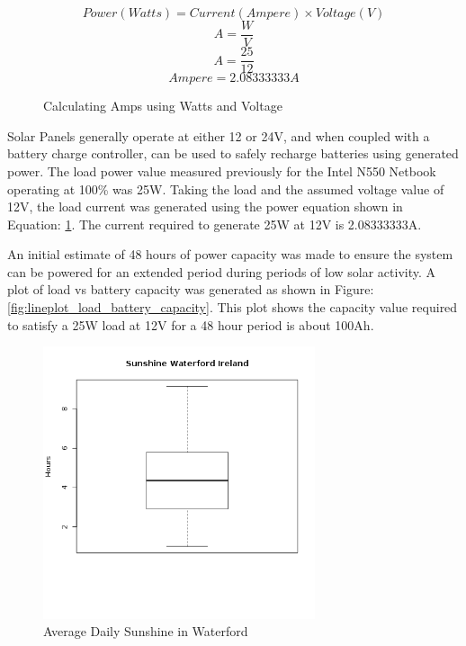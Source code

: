 %
\begin{figure}[here]
	\centering
	\begin{equation}
	Power(Watts) = Current(Ampere) \times Voltage(V)
	\end{equation}
	\begin{equation}
	A = \frac{W}{V}
	\end{equation}
	\begin{equation}
	A = \frac{25}{12}
	\end{equation}
	\begin{equation}
	Ampere = 2.08333333 A
	\end{equation}
	\caption{Calculating Amps using Watts and Voltage}
	\label{fig:power_equation}
\end{figure}
%

Solar Panels generally operate at either 12 or 24V, and when coupled with a battery charge controller, can be used to safely recharge batteries using generated power. The load power value measured previously for the Intel N550 Netbook operating at 100\% was 25W. Taking the load and the assumed voltage value of 12V, the load current was generated using the power equation shown in Equation: \ref{fig:power_equation}. The current required to generate 25W at 12V is 2.08333333A.

An initial estimate of 48 hours of power capacity was made to ensure the system can be powered for an extended period during periods of low solar activity. A plot of load vs battery capacity was generated as shown in Figure: \ref{fig:lineplot_load_battery_capacity}. This plot shows the capacity value required to satisfy a 25W load at 12V for a 48 hour period is about 100Ah.

%
\begin{figure}[!htb]
	\centering
	\includegraphics[width=8cm]{images/62}
	\caption{Average Daily Sunshine in Waterford}
	\label{fig:boxplot_hours_sunshine_waterford}
\end{figure}
%


